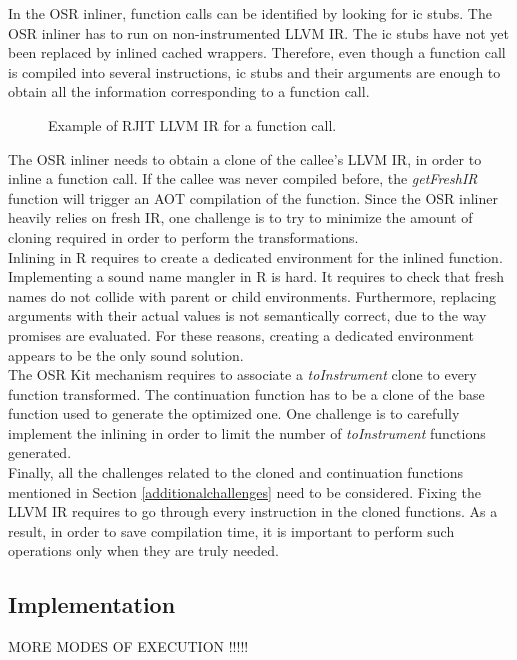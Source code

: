 In the OSR inliner, function calls can be identified by looking for ic stubs.
The OSR inliner has to run on non-instrumented LLVM IR. 
The ic stubs have not yet been replaced by inlined cached wrappers.
Therefore, even though a function call is compiled into several instructions, ic stubs and their arguments are enough to obtain all the information corresponding to a function call.\\

\begin{figure}[h]
\caption{Example of RJIT LLVM IR for a function call.}
\label{fig:functioncall}
\end{figure}


The OSR inliner needs to obtain a clone of the callee's LLVM IR, in order to inline a function call.
If the callee was never compiled before, the \textit{getFreshIR} function will trigger an AOT compilation of the function.
Since the OSR inliner heavily relies on fresh IR, one challenge is to try to minimize the amount of cloning required in order to perform the transformations.\\

Inlining in R requires to create a dedicated environment for the inlined function.
Implementing a sound name mangler in R is hard. 
It requires to check that fresh names do not collide with parent or child environments.
Furthermore, replacing arguments with their actual values is not semantically correct, due to the way promises are evaluated.
For these reasons, creating a dedicated environment appears to be the only sound solution.\\

The OSR Kit mechanism requires to associate a \textit{toInstrument} clone to every function transformed.
The continuation function has to be a clone of the base function used to generate the optimized one.
One challenge is to carefully implement the inlining in order to limit the number of \textit{toInstrument} functions generated.\\

Finally, all the challenges related to the cloned and continuation functions mentioned in Section \ref{additionalchallenges} need to be considered.
Fixing the LLVM IR requires to go through every instruction in the cloned functions.
As a result, in order to save compilation time, it is important to perform such operations only when they are truly needed.\\

\subsection{Implementation}
MORE MODES OF EXECUTION !!!!!\\

